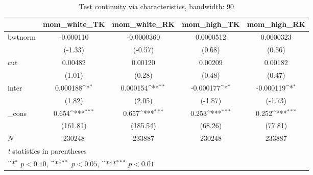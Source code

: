 \begin{table}[htbp]\centering
\def\sym#1{\ifmmode^{#1}\else\(^{#1}\)\fi}
\caption{Test continuity via characteristics, bandwidth: 90}
\begin{tabular}{l*{4}{c}}
\hline\hline
            &\multicolumn{1}{c}{mom\_white\_TK}&\multicolumn{1}{c}{mom\_white\_RK}&\multicolumn{1}{c}{mom\_high\_TK}&\multicolumn{1}{c}{mom\_high\_RK}\\
\hline
bwtnorm     &   -0.000110         &  -0.0000360         &   0.0000512         &   0.0000323         \\
            &     (-1.33)         &     (-0.57)         &      (0.68)         &      (0.56)         \\
[1em]
cut         &     0.00482         &     0.00120         &     0.00209         &     0.00182         \\
            &      (1.01)         &      (0.28)         &      (0.48)         &      (0.47)         \\
[1em]
inter       &    0.000188\sym{*}  &    0.000154\sym{**} &   -0.000177\sym{*}  &   -0.000119\sym{*}  \\
            &      (1.82)         &      (2.05)         &     (-1.87)         &     (-1.73)         \\
[1em]
\_cons      &       0.654\sym{***}&       0.657\sym{***}&       0.253\sym{***}&       0.252\sym{***}\\
            &    (161.81)         &    (185.54)         &     (68.26)         &     (77.81)         \\
\hline
\(N\)       &      230248         &      233887         &      230248         &      233887         \\
\hline\hline
\multicolumn{5}{l}{\footnotesize \textit{t} statistics in parentheses}\\
\multicolumn{5}{l}{\footnotesize \sym{*} \(p<0.10\), \sym{**} \(p<0.05\), \sym{***} \(p<0.01\)}\\
\end{tabular}
\end{table}
